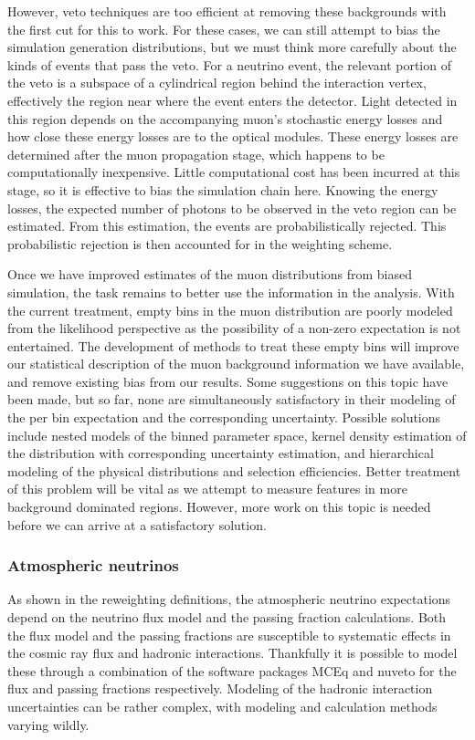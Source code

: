 However, veto techniques are too efficient at removing these backgrounds with the first cut for this to work.
For these cases, we can still attempt to bias the simulation generation distributions, but we must think more carefully about the kinds of events that pass the veto.
For a neutrino event, the relevant portion of the veto is a subspace of a cylindrical region behind the interaction vertex, effectively the region near where the event enters the detector.
Light detected in this region depends on the accompanying muon's stochastic energy losses and how close these energy losses are to the optical modules.
These energy losses are determined after the muon propagation stage, which happens to be computationally inexpensive.
Little computational cost has been incurred at this stage, so it is effective to bias the simulation chain here.
Knowing the energy losses, the expected number of photons to be observed in the veto region can be estimated.
From this estimation, the events are probabilistically rejected.
This probabilistic rejection is then accounted for in the weighting scheme.

Once we have improved estimates of the muon distributions from biased simulation, the task remains to better use the information in the analysis.
With the current treatment, empty bins in the muon distribution are poorly modeled from the likelihood perspective as the possibility of a non-zero expectation is not entertained.
The development of methods to treat these empty bins will improve our statistical description of the muon background information we have available, and remove existing bias from our results.
Some suggestions on this topic have been made, but so far, none are simultaneously satisfactory in their modeling of the per bin expectation and the corresponding uncertainty.
Possible solutions include nested models of the binned parameter space, kernel density estimation of the distribution with corresponding uncertainty estimation, and hierarchical modeling of the physical distributions and selection efficiencies.
Better treatment of this problem will be vital as we attempt to measure features in more background dominated regions.
However, more work on this topic is needed before we can arrive at a satisfactory solution.

\subsubsection{Atmospheric neutrinos}
As shown in the reweighting definitions, the atmospheric neutrino expectations depend on the neutrino flux model and the passing fraction calculations.
Both the flux model and the passing fractions are susceptible to systematic effects in the cosmic ray flux and hadronic interactions.
Thankfully it is possible to model these through a combination of the software packages MCEq and nuveto for the flux and passing fractions respectively.
Modeling of the hadronic interaction uncertainties can be rather complex, with modeling and calculation methods varying wildly.

